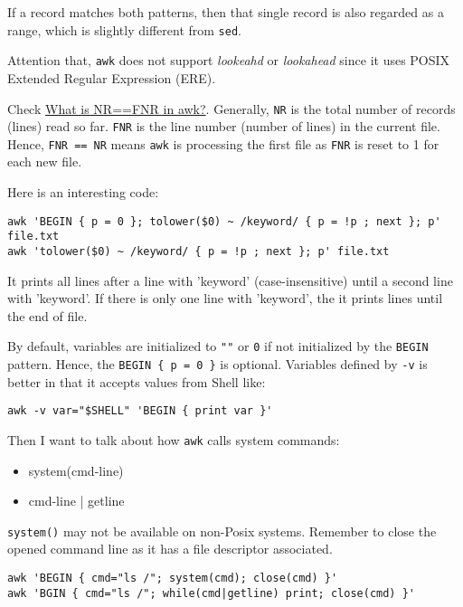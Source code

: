 If a record matches both patterns, then that single record is also
regarded as a range, which is slightly different from
\lstinline|sed|.

Attention that, \lstinline|awk| does not support \textit{lookeahd}
or \textit{lookahead} since it uses POSIX Extended Regular
Expression (ERE).

Check \href{https://stackoverflow.com/q/32481877}{What is NR==FNR
  in awk?}. Generally, \verb|NR| is the total number of records
(lines) read so far. \verb|FNR| is the line number (number of
lines) in the current file. Hence, \verb|FNR == NR| means
\verb|awk| is processing the first file as \verb|FNR| is reset to
1 for each new file.

Here is an interesting code:

\begin{lstlisting}
awk 'BEGIN { p = 0 }; tolower($0) ~ /keyword/ { p = !p ; next }; p' file.txt
awk 'tolower($0) ~ /keyword/ { p = !p ; next }; p' file.txt
\end{lstlisting}

It prints all lines after a line with 'keyword' (case-insensitive)
until a second line with 'keyword'. If there is only one line with
'keyword', the it prints lines until the end of file.

By default, variables are initialized to \verb|""| or \verb|0| if
not initialized by the \lstinline|BEGIN| pattern. Hence, the
\lstinline|BEGIN { p = 0 }| is optional. Variables defined by
\verb|-v| is better in that it accepts values from Shell like:

\begin{lstlisting}
awk -v var="$SHELL" 'BEGIN { print var }'
\end{lstlisting}

Then I want to talk about how \verb|awk| calls system commands:

\begin{itemize}
\item system(cmd-line)
\item cmd-line | getline
\end{itemize}

\verb|system()| may not be available on non-Posix
systems. Remember to close the opened command line as it has a
file descriptor associated.

\begin{lstlisting}
awk 'BEGIN { cmd="ls /"; system(cmd); close(cmd) }'
awk 'BGIN { cmd="ls /"; while(cmd|getline) print; close(cmd) }'
\end{lstlisting}


